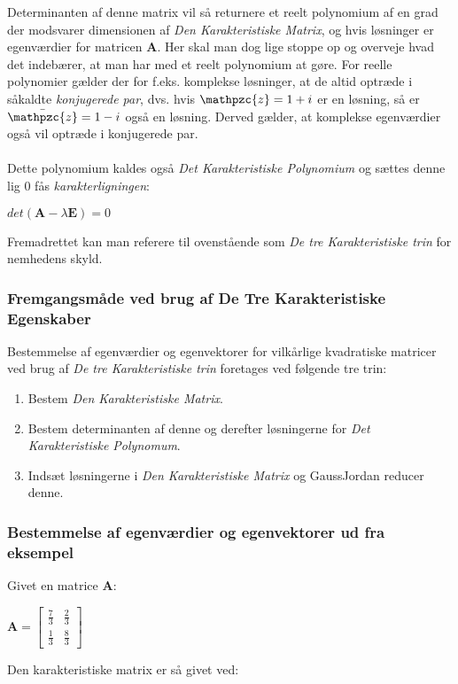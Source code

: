 \documentclass{article}
\newcommand{\cent}[1]{\begin{center}#1\end{center}}
\newcommand{\smallMatrix}[4]{\ensuremath{\begin{bmatrix}
			#1 & #2 \\
			#3 & #4
\end{bmatrix}}}
\newcommand{\script}[1]{\mathpzc{#1}}
\begin{document}
  	Determinanten af denne matrix vil så returnere et reelt polynomium af en grad der modsvarer dimensionen af \textit{Den Karakteristiske Matrix}, og hvis løsninger er egenværdier for matricen \textbf{A}. Her skal man dog lige stoppe op og overveje hvad det indebærer, at man har med et reelt polynomium at gøre. For reelle polynomier gælder der for f.eks. komplekse løsninger, at de altid optræde i såkaldte \textit{konjugerede par}, dvs. hvis $  \script{z} =1 + i $ er en løsning, så er $ \bar{\script{z}} =1 - i $ også en løsning. Derved gælder, at komplekse egenværdier også vil optræde i konjugerede par.\\
  	\\
  	Dette polynomium kaldes også \textit{Det Karakteristiske Polynomium} og sættes denne lig 0 fås \textit{karakterligningen}:
  	
  	\cent{$ det(\textbf{A}-\lambda \textbf{E}) = 0 $}
  	
  	Fremadrettet kan man referere til ovenstående som \textit{De tre Karakteristiske trin} for nemhedens skyld.
  	
  	\subsubsection{Fremgangsmåde ved brug af De Tre Karakteristiske Egenskaber}
  	
  	Bestemmelse af egenværdier og egenvektorer for vilkårlige kvadratiske matricer ved brug af \textit{De tre Karakteristiske trin} foretages ved følgende tre trin:
  	\begin{enumerate}
  		\item  Bestem \textit{Den Karakteristiske Matrix}.
  		\item Bestem determinanten af denne og derefter løsningerne for \textit{Det Karakteristiske Polynomum}.
  		\item Indsæt løsningerne i \textit{Den Karakteristiske Matrix} og GaussJordan reducer denne.
  	\end{enumerate}
  	
	\subsubsection{Bestemmelse af egenværdier og egenvektorer ud fra eksempel}
	
	Givet en matrice \textbf{A}:
	
	\cent{$ \textbf{A} = \smallMatrix{\frac{7}{3}}{\frac{2}{3}}{\frac{1}{3}}{\frac{8}{3}} $}
	
	Den karakteristiske matrix er så givet ved:
	
\end{document}
